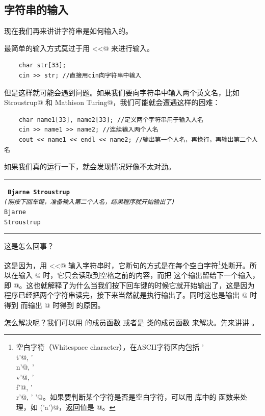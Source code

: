 \subsection*{字符串的输入}
现在我们再来讲讲字符串是如何输入的。\par
最简单的输入方式莫过于用 \lstinline@cin<<@ 来进行输入。
\begin{lstlisting}
    char str[33];
    cin >> str; //直接用cin向字符串中输入
\end{lstlisting}
但是这样就可能会遇到问题。如果我们要向字符串中输入两个英文名，比如 \lstinline@Bjarne Stroustrup@ 和 \lstinline@Alan Mathison Turing@，我们可能就会遭遇这样的困难：
\begin{lstlisting}
    char name1[33], name2[33]; //定义两个字符串用于输入人名
    cin >> name1 >> name2; //连续输入两个人名
    cout << name1 << endl << name2; //输出第一个人名，再换行，再输出第二个人名
\end{lstlisting}
如果我们真的运行一下，就会发现情况好像不太对劲。\\\noindent\rule{\linewidth}{.2pt}\texttt{
\textbf{Bjarne Stroustrup}\\\textit{(刚按下回车键，准备输入第二个人名，结果程序就开始输出了)}\\
Bjarne\\
Stroustrup
}\\\noindent\rule{\linewidth}{.2pt}
这是怎么回事？\par
这是因为，用 \lstinline@cin<<@ 输入字符串时，它断句的方式是在每个空白字符\footnote{空白字符（Whitespace character），在ASCII字符区内包括 \lstinline@'\\t'@, \lstinline@'\\n'@, \lstinline@'\\v'@, \lstinline@'\\f'@, \lstinline@'\\r'@, \lstinline@' '@。如果要判断某个字符是否是空白字符，可以用 \lstinline@cctype@ 库中的 \lstinline@isspace@ 函数来处理，如 \lstinline@isspace('a')@，返回值是 @。}处断开。所以在输入 @ 时，它只会读取到空格之前的内容，而把 \lstinline@Stroustrup@ 这个输出留给下一个输入，即 @。这也就解释了为什么当我们按下回车键的时候它就开始输出了，这是因为程序已经把两个字符串读完，接下来当然就是执行输出了。同时这也是输出 @ 时得到 \lstinline@Bjarne@ 而输出 @ 时得到 \lstinline@Stroustrup@ 的原因。\par
怎么解决呢？我们可以用 \lstinline@cin@ 的成员函数 \lstinline@get@ 或者是 \lstinline@istream@ 类的成员函数 \lstinline@getline@ 来解决。先来讲讲 \lstinline@getline@。\par
